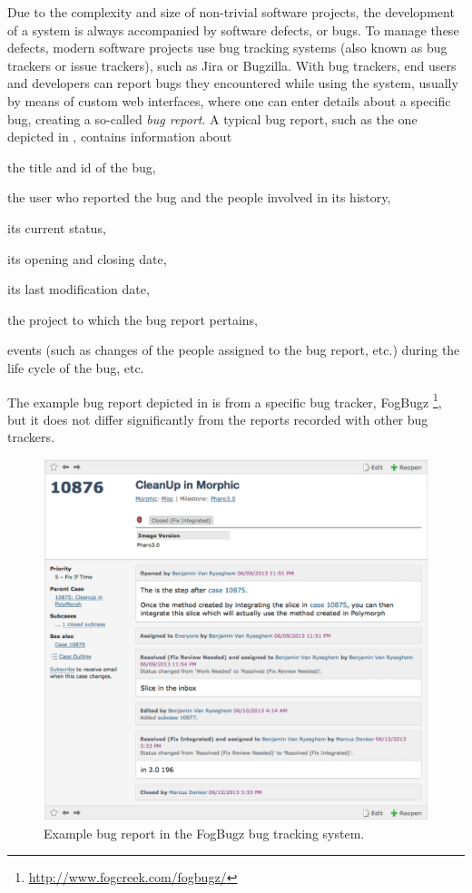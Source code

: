 Due to the complexity and size of non-trivial software projects, the development of a system is always accompanied by software defects, or bugs.
To manage these defects, modern software projects use bug tracking systems (also known as bug trackers or issue trackers), such as Jira or Bugzilla.
With bug trackers, end users and developers can report bugs they encountered while using the system, usually by means of custom web interfaces, where one can enter details about a specific bug, creating a so-called \emph{bug report}.
A typical bug report, such as the one depicted in , contains information about \begin{inparaenum}[(1)] \item the title and id of the bug, \item the user who reported the bug and the people involved in its history, \item its current status, \item its opening and closing date, \item its last modification date, \item the project to which the bug report pertains, \item events (such as changes of the people assigned to the bug report, etc.) during the life cycle of the bug, etc. \end{inparaenum}
The example bug report depicted in  is from a specific bug tracker, FogBugz \footnote{\url{http://www.fogcreek.com/fogbugz/}}, but it does not differ significantly from the reports recorded with other bug trackers.

\begin{figure}[ht]
\centering
\includegraphics[width=.95\linewidth,trim=0 300 0 0,clip=true]{Images/visualize/fogbugz-screen.png}
\caption{Example bug report in the FogBugz bug tracking system.}
\label{fogbugz-example}
\end{figure}


